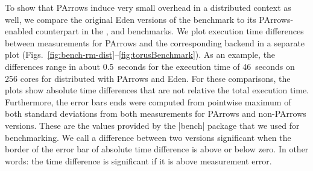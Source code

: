 To show that PArrows induce very small overhead in a distributed context as well, we compare the original Eden
versions of the benchmark to its PArrows-enabled counterpart in the \rmtest, \torustest and \jacobitest benchmarks. We plot execution time differences between measurements for
PArrows and the corresponding backend in a separate plot
(Figs.~\ref{fig:bench-rm-dist}--\ref{fig:torusBenchmark}). As an example, the differences range in
about 0.5~seconds for the execution time of 46~seconds on 256 cores
for distributed \rmtest with PArrows and Eden. For these comparisons, the plots show absolute
time differences that are not relative \wrt the total execution time.
Furthermore, the error bars ends were computed from pointwise maximum of both standard
deviations from both measurements for PArrows and non-PArrows
versions. These are the values provided by the |bench| package that we
used for benchmarking. We call a difference between two versions
significant when the border of the error bar of absolute time
difference is above or below zero. In other words: the time
difference is significant if it is above measurement error.

\subsubsection{\rmtest}\label{sec:rmtest}

\newcommand{\performanceSkelRMSM}[2]{
\performanceplot{Parallel run time of \rmtest ``#2''}{Eden CP, GpH, |Par| Monad}{16}{4}{
\addplot+ [very thick] table [scatter, x="nCores", y="time", col sep=comma, mark=none,
smooth]{benchmarks/sm-rm/bench-sm-rm.bench.skelrm-parr-eden-cp-#1-#2.csv};
\addplot+ [very thick] table [scatter, x="nCores", y="time", col sep=comma, mark=none,
smooth]{benchmarks/sm-rm/bench-sm-rm.bench.skelrm-parr-mult-#1-#2.csv};
\addplot+ [very thick] table [scatter, x="nCores", y="time", col sep=comma, mark=none,
smooth]{benchmarks/sm-rm/bench-sm-rm.bench.skelrm-parr-par-#1-#2.csv};
}{17}{\plotwidthSMP}
}

\newcommand{\speedupSkelRMSM}[2]{
\speedupplot{Speedup of \rmtest ``#2''}{Eden CP, GpH, |Par| Monad}{16}{4}{
\addplot+ [very thick] table [scatter, x="nCores", y="speedup", col sep=comma, mark=none,
smooth]{benchmarks/sm-rm/bench-sm-rm.bench.skelrm-parr-eden-cp-#1-#2.csv};
\addplot+ [very thick] table [scatter, x="nCores", y="speedup", col sep=comma, mark=none,
smooth]{benchmarks/sm-rm/bench-sm-rm.bench.skelrm-parr-mult-#1-#2.csv};
\addplot+ [very thick] table [scatter, x="nCores", y="speedup", col sep=comma, mark=none,
smooth]{benchmarks/sm-rm/bench-sm-rm.bench.skelrm-parr-par-#1-#2.csv};
}{17}{\plotwidthSMP}
}

